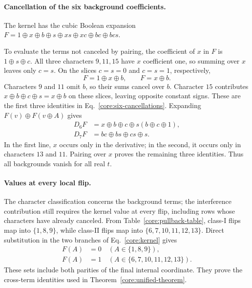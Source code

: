 \paragraph{Cancellation of the six background coefficients.}
The kernel has the cubic Boolean expansion $F=1\oplus x\oplus b\oplus s\oplus xs\oplus xc\oplus bc\oplus bcs$.

To evaluate the terms not canceled by pairing, the coefficient of $x$ in $F$ is $1\oplus s\oplus c$. All three characters $9,11,15$ have $x$ coefficient one, so summing over $x$ leaves only $c=s$. On the slices $c=s=0$ and $c=s=1$, respectively,
\begin{equation}
 F=1\oplus x\oplus b,\qquad F=x\oplus b.
\end{equation}
Characters $9$ and $11$ omit $b$, so their sums cancel over $b$. Character $15$ contributes $x\oplus b\oplus c\oplus s=x\oplus b$ on these slices, leaving opposite constant signs. These are the first three identities in Eq.~\eqref{core:six-cancellations}. Expanding $F(v)\oplus F(v\oplus A)$ gives
\begin{align}
 D_6F&=x\oplus b\oplus c\oplus s(b\oplus c\oplus1),\nonumber\\
 D_7F&=bc\oplus bs\oplus cs\oplus s.
 \label{core:derivatives}
\end{align}
In the first line, $x$ occurs only in the derivative; in the second, it occurs only in characters $13$ and $11$. Pairing over $x$ proves the remaining three identities. Thus all backgrounds vanish for all real $t$.

\paragraph{Values at every local flip.}
The character classification concerns the background terms; the interference contribution still requires the kernel value at every flip, including rows whose characters have already canceled. From Table~\ref{core:pullback-table}, class-I flips map into $\{1,8,9\}$, while class-II flips map into $\{6,7,10,11,12,13\}$. Direct substitution in the two branches of Eq.~\eqref{core:kernel} gives
\begin{equation}
 \begin{aligned}
 F(A)&=0\quad(A\in\{1,8,9\}),\\
 F(A)&=1\quad(A\in\{6,7,10,11,12,13\}).
 \end{aligned}
 \label{core:flip-values}
\end{equation}
These sets include both parities of the final internal coordinate. They prove the cross-term identities used in Theorem~\ref{core:unified-theorem}.


